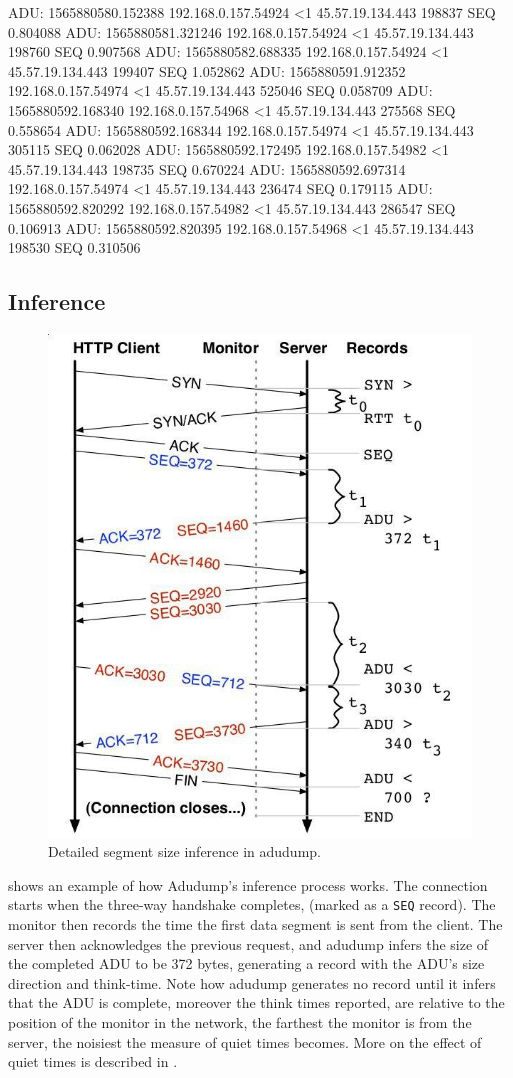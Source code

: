 \begin{adu}[caption={Incoming traffic trace of Mulan, captured at 10Mbps (first 10 segments).}, label={lst:adutrace}]
ADU: 1565880580.152388 192.168.0.157.54924 <1 45.57.19.134.443 198837 SEQ 0.804088
ADU: 1565880581.321246 192.168.0.157.54924 <1 45.57.19.134.443 198760 SEQ 0.907568
ADU: 1565880582.688335 192.168.0.157.54924 <1 45.57.19.134.443 199407 SEQ 1.052862
ADU: 1565880591.912352 192.168.0.157.54974 <1 45.57.19.134.443 525046 SEQ 0.058709
ADU: 1565880592.168340 192.168.0.157.54968 <1 45.57.19.134.443 275568 SEQ 0.558654
ADU: 1565880592.168344 192.168.0.157.54974 <1 45.57.19.134.443 305115 SEQ 0.062028
ADU: 1565880592.172495 192.168.0.157.54982 <1 45.57.19.134.443 198735 SEQ 0.670224
ADU: 1565880592.697314 192.168.0.157.54974 <1 45.57.19.134.443 236474 SEQ 0.179115
ADU: 1565880592.820292 192.168.0.157.54982 <1 45.57.19.134.443 286547 SEQ 0.106913
ADU: 1565880592.820395 192.168.0.157.54968 <1 45.57.19.134.443 198530 SEQ 0.310506
\end{adu}

\subsection{Inference}

\begin{figure}[!h]
  \centering
  \includegraphics[width=0.6\columnwidth]{img/adudump.png}
  \caption{Detailed segment size inference in adudump.}
  \label{fig:adudump}
\end{figure}

 shows an example of how Adudump's inference process works.
The connection starts when the three-way handshake completes, (marked as a
\texttt{SEQ} record). The monitor then records the time the first data segment
is sent from the client. The server then acknowledges the previous request, and
adudump infers the size of the completed ADU to be 372 bytes, generating a
record with the ADU's size direction and think-time. Note how adudump generates
no record until it infers that the ADU is complete, moreover the think times
reported, are relative to the position of the monitor in the network, the
farthest the monitor is from the server, the noisiest the measure of quiet
times becomes. More on the effect of quiet times is described in
.

